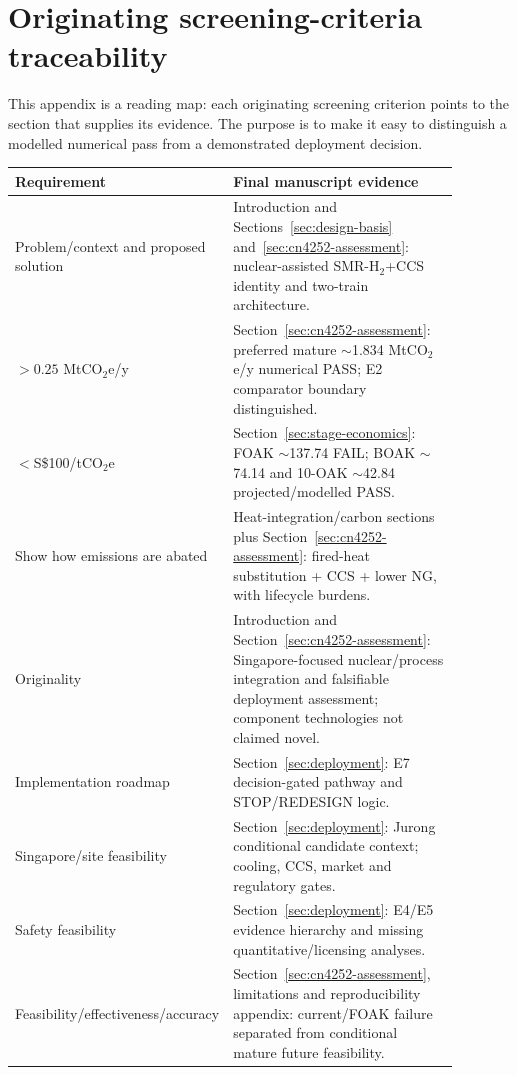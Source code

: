 \section{Originating screening-criteria traceability}

This appendix is a reading map: each originating screening criterion points to the section that supplies its evidence. The purpose is to make it easy to distinguish a modelled numerical pass from a demonstrated deployment decision.

\begin{center}
\begin{tabular}{p{0.30\linewidth}p{0.58\linewidth}}
\toprule
Requirement & Final manuscript evidence \\
\midrule
Problem/context and proposed solution & Introduction and Sections~\ref{sec:design-basis} and~\ref{sec:cn4252-assessment}: nuclear-assisted SMR-H$_2$+CCS identity and two-train architecture.\\
$>0.25$ MtCO$_2$e/y & Section~\ref{sec:cn4252-assessment}: preferred mature $\sim$1.834 MtCO$_2$e/y numerical PASS; E2 comparator boundary distinguished.\\
$<$S\$100/tCO$_2$e & Section~\ref{sec:stage-economics}: FOAK $\sim$137.74 FAIL; BOAK $\sim$74.14 and 10-OAK $\sim$42.84 projected/modelled PASS.\\
Show how emissions are abated & Heat-integration/carbon sections plus Section~\ref{sec:cn4252-assessment}: fired-heat substitution + CCS + lower NG, with lifecycle burdens.\\
Originality & Introduction and Section~\ref{sec:cn4252-assessment}: Singapore-focused nuclear/process integration and falsifiable deployment assessment; component technologies not claimed novel.\\
Implementation roadmap & Section~\ref{sec:deployment}: E7 decision-gated pathway and STOP/REDESIGN logic.\\
Singapore/site feasibility & Section~\ref{sec:deployment}: Jurong conditional candidate context; cooling, CCS, market and regulatory gates.\\
Safety feasibility & Section~\ref{sec:deployment}: E4/E5 evidence hierarchy and missing quantitative/licensing analyses.\\
Feasibility/effectiveness/accuracy & Section~\ref{sec:cn4252-assessment}, limitations and reproducibility appendix: current/FOAK failure separated from conditional mature future feasibility.\\
\bottomrule
\end{tabular}
\end{center}

